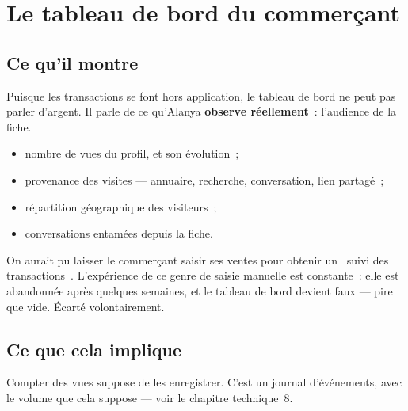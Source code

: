 \chapter{Le tableau de bord du commerçant}

\section{Ce qu'il montre}

Puisque les transactions se font hors application, le tableau de bord ne peut pas parler
d'argent. Il parle de ce qu'Alanya \textbf{observe réellement}~: l'audience de la fiche.

\begin{itemize}[leftmargin=1.4em]
  \item nombre de vues du profil, et son évolution~;
  \item provenance des visites --- annuaire, recherche, conversation, lien partagé~;
  \item répartition géographique des visiteurs~;
  \item conversations entamées depuis la fiche.
\end{itemize}

\begin{note}
On aurait pu laisser le commerçant saisir ses ventes pour obtenir un
\guillemotleft~suivi des transactions~\guillemotright. L'expérience de ce genre de saisie
manuelle est constante~: elle est abandonnée après quelques semaines, et le tableau de bord
devient faux --- pire que vide. Écarté volontairement.
\end{note}

\section{Ce que cela implique}

Compter des vues suppose de les enregistrer. C'est un journal d'événements, avec le volume
que cela suppose --- voir le chapitre technique~8.
